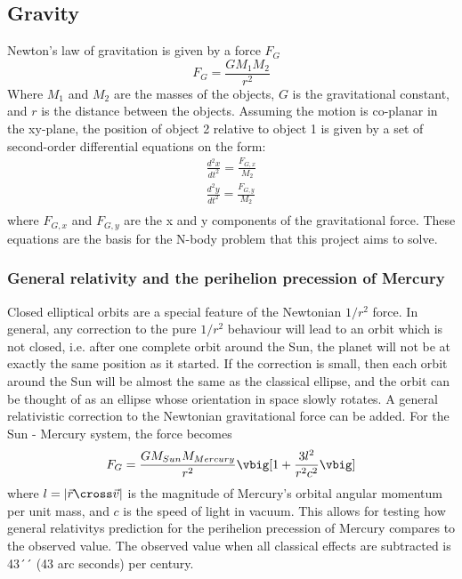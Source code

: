 \subsection{Gravity}
Newton's law of gravitation is given by a force $F_G$
\begin{equation}\label{eq:grav}
F_G = \frac{GM_1M_2}{r^2}
\end{equation}
Where $M_1$ and $M_2$ are the masses of the objects, $G$ is the gravitational constant, and $r$ 
is the distance between the objects.
Assuming the motion is co-planar in the xy-plane, the position of object 2 relative to  
object 1 is given by a set of second-order differential equations on the form:
\begin{align*}
\frac{d^2x}{dt^2} = \frac{F_{G,x}}{M_2} \\
\frac{d^2y}{dt^2} = \frac{F_{G,y}}{M_2} \\
\end{align*}
where $F_{G,x}$ and $F_{G,y}$ are the x and y components of the gravitational force.
These equations are the basis for the N-body problem that this project aims to solve.

\subsubsection{General relativity and the perihelion precession of Mercury}

Closed elliptical orbits are a special feature of the Newtonian $1/r^2$ force. In
general, any correction to the pure $1/r^2$ behaviour will lead to an orbit which is
not closed, i.e. after one complete orbit around the Sun, the planet will not be
at exactly the same position as it started. If the correction is small, then each
orbit around the Sun will be almost the same as the classical ellipse, and the
orbit can be thought of as an ellipse whose orientation in space slowly rotates.
A general relativistic correction to the Newtonian gravitational force can be added. For the 
Sun - Mercury system, the force becomes
\begin{equation*}
F_G = \frac{GM_{Sun}M_{Mercury}}{r^2}\vbig[1+\frac{3l^2}{r^2c^2}\vbig]
\end{equation*}
where $l = |\vec{r} \cross \vec{v}|$ is the magnitude of Mercury's orbital angular momentum per unit
mass, and $c$ is the speed of light in vacuum.
This allows for testing how general relativitys prediction for the perihelion precession of Mercury
compares to the observed value. The observed value when all classical effects are subtracted is 43´´
(43 arc seconds) per century.

